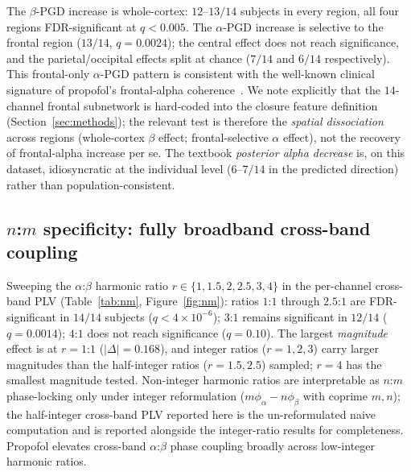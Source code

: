 \documentclass[11pt,a4paper]{article}
\begin{document}
The $\beta$-PGD increase is whole-cortex: $12$--$13/14$ subjects in every region, all four regions FDR-significant at $q<0.005$. The $\alpha$-PGD increase is selective to the frontal region ($13/14$, $q=0.0024$); the central effect does not reach significance, and the parietal/occipital effects split at chance ($7/14$ and $6/14$ respectively). This frontal-only $\alpha$-PGD pattern is consistent with the well-known clinical signature of propofol's frontal-alpha coherence~\cite{purdon2013electroencephalogram,ching2010thalamocortical,lewis2012rapid}. We note explicitly that the $14$-channel frontal subnetwork is hard-coded into the closure feature definition (Section~\ref{sec:methods}); the relevant test is therefore the \emph{spatial dissociation} across regions (whole-cortex $\beta$ effect; frontal-selective $\alpha$ effect), not the recovery of frontal-alpha increase per se. The textbook \emph{posterior alpha decrease} is, on this dataset, idiosyncratic at the individual level ($6$--$7/14$ in the predicted direction) rather than population-consistent.

\subsection{$n$:$m$ specificity: fully broadband cross-band coupling}\label{sec:nm}

Sweeping the $\alpha$:$\beta$ harmonic ratio $r\in\{1,1.5,2,2.5,3,4\}$ in the per-channel cross-band PLV (Table~\ref{tab:nm}, Figure~\ref{fig:nm}): ratios $1$:$1$ through $2.5$:$1$ are FDR-significant in $14/14$ subjects ($q<4\!\times\!10^{-6}$); $3$:$1$ remains significant in $12/14$ ($q=0.0014$); $4$:$1$ does not reach significance ($q = 0.10$). The largest \emph{magnitude} effect is at $r=1$:$1$ ($|\Delta| = 0.168$), and integer ratios ($r = 1, 2, 3$) carry larger magnitudes than the half-integer ratios ($r = 1.5, 2.5$) sampled; $r = 4$ has the smallest magnitude tested. Non-integer harmonic ratios are interpretable as $n$:$m$ phase-locking only under integer reformulation ($m \phi_\alpha - n \phi_\beta$ with coprime $m, n$); the half-integer cross-band PLV reported here is the un-reformulated naive computation and is reported alongside the integer-ratio results for completeness. Propofol elevates cross-band $\alpha$:$\beta$ phase coupling broadly across low-integer harmonic ratios.
\end{document}
